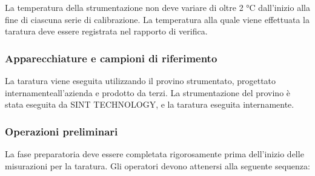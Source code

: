 \documentclass[a4paper, twoside]{article}
\begin{document}
La temperatura della strumentazione non deve variare di oltre 2 °C dall'inizio alla fine di ciascuna serie di calibrazione. La temperatura alla quale viene effettuata la taratura deve essere registrata nel rapporto di verifica.

\subsubsection{Apparecchiature e campioni di riferimento}
La taratura viene eseguita utilizzando il provino strumentato, progettato internamenteall'azienda e prodotto da terzi. La strumentazione del provino è stata eseguita da SINT TECHNOLOGY, e la taratura eseguita internamente.

\subsubsection{Operazioni preliminari}
La fase preparatoria deve essere completata rigorosamente prima dell'inizio delle misurazioni per la taratura. Gli operatori devono attenersi alla seguente sequenza:
\end{document}
